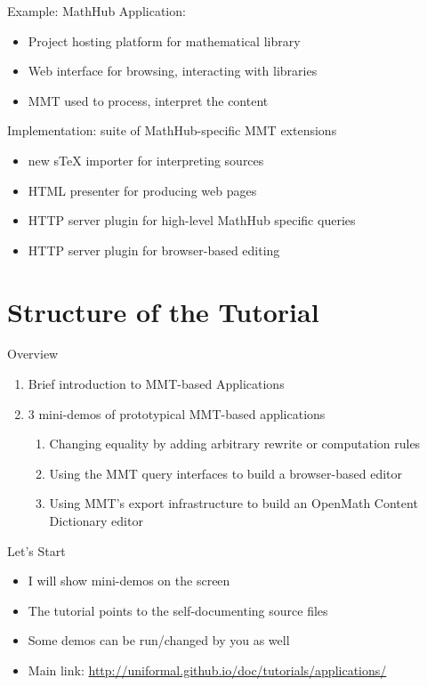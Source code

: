 \documentclass{beamer}
\begin{document}
\begin{myframe}{Example: MathHub}
Application:
\begin{itemize}
  \item Project hosting platform for mathematical library
  \item Web interface for browsing, interacting with libraries
  \item MMT used to process, interpret the content
\end{itemize}

Implementation: suite of MathHub-specific MMT extensions
\begin{itemize}
 \item new sTeX importer for interpreting sources
 \item HTML presenter for producing web pages
 \item HTTP server plugin for high-level MathHub specific queries
 \item HTTP server plugin for browser-based editing
 \end{itemize}
\end{myframe}


\section{Structure of the Tutorial}

\begin{myframe}{Overview}
\begin{enumerate}
 \item Brief introduction to MMT-based Applications
 \item 3 mini-demos of prototypical MMT-based applications 
   \begin{enumerate}
    \item Changing equality by adding arbitrary rewrite or computation rules
    \item Using the MMT query interfaces to build a browser-based editor
    \item Using MMT's export infrastructure to build an OpenMath Content Dictionary editor
   \end{enumerate}
 \end{enumerate}
\end{myframe}


\begin{myframe}{Let's Start}
\begin{itemize}
 \item I will show mini-demos on the screen
 \item The tutorial points to the self-documenting source files
 \item Some demos can be run/changed by you as well
 \item Main link: \url{http://uniformal.github.io/doc/tutorials/applications/}
\end{itemize}
\end{myframe}
\end{document}

